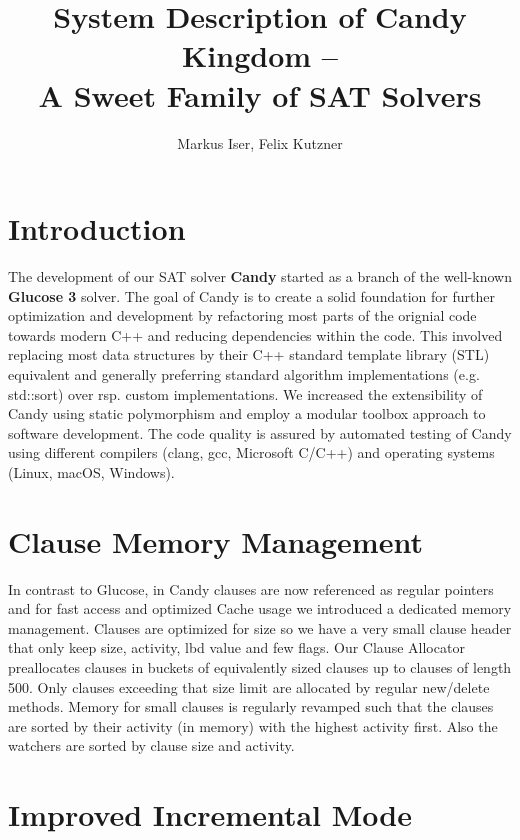 \documentclass{llncs}
\title{System Description of Candy Kingdom --\\ A Sweet Family of SAT Solvers}
\author{Markus Iser, Felix Kutzner}
\institute{
  Karlsruhe Institute of Technology (KIT), Germany\\
  \url{{markus.iser, felix.kutzner}@kit.edu}
}
\begin{document}
\maketitle

\begin{abstract}

\end{abstract}

\section{Introduction}

The development of our SAT solver \textbf{Candy} started as a branch of the well-known \textbf{Glucose 3} solver.
The goal of Candy is to create a solid foundation for further optimization and development by refactoring most parts of the orignial code towards modern C++ and reducing dependencies within the code.
This involved replacing most data structures by their C++ standard template library (STL) equivalent and generally preferring standard algorithm implementations (e.g. std::sort) over rsp. custom implementations.
We increased the extensibility of Candy using static polymorphism and employ a modular toolbox approach to software development.
The code quality is assured by automated testing of Candy using different compilers (clang, gcc, Microsoft C/C++) and operating systems (Linux, macOS, Windows).

\section{Clause Memory Management}
\label{sec:clauses}

In contrast to Glucose, in Candy clauses are now referenced as regular pointers and for fast access and optimized Cache usage we introduced a dedicated memory management. Clauses are optimized for size so we have a very small clause header that only keep size, activity, lbd value and few flags. Our Clause Allocator preallocates clauses in buckets of equivalently sized clauses up to clauses of length 500. Only clauses exceeding that size limit are allocated by regular new/delete methods. Memory for small clauses is regularly revamped such that the clauses are sorted by their activity (in memory) with the highest activity first. Also the watchers are sorted by clause size and activity. 

\section{Improved Incremental Mode}
\end{document}
